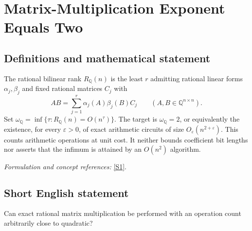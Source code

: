 \documentclass[11pt,a4paper]{article}
\newcommand{\Q}{\mathbb{Q}}
\newcommand{\sref}[2]{\hyperlink{source:#1:#2}{[S#2]}}
\newif\ifshowcatalogue
\newcommand{\cataloguescope}[1]{\ifshowcatalogue
 \paragraph{Exact scope in the supplied catalogue.}
 \begin{quote}\small #1\end{quote}\fi}
\numberwithin{equation}{section}
\begin{document}
\setcounter{section}{25}
\clearpage
\section{\texorpdfstring{Matrix-Multiplication Exponent Equals Two}{Matrix-Multiplication Exponent Equals Two}}\label{26}
\subsection{Definitions and mathematical statement}
The rational bilinear rank $R_{\Q}(n)$ is the least $r$ admitting rational linear forms $\alpha_j,\beta_j$ and fixed rational matrices $C_j$ with
\[
 AB=\sum_{j=1}^r\alpha_j(A)\beta_j(B)C_j\qquad(A,B\in\Q^{n\times n}).
\]
Set $\omega_{\Q}=\inf\{\tau:R_{\Q}(n)=O(n^\tau)\}$. The target is $\omega_{\Q}=2$, or equivalently the existence, for every $\varepsilon>0$, of exact arithmetic circuits of size $O_\varepsilon(n^{2+\varepsilon})$. This counts arithmetic operations at unit cost. It neither bounds coefficient bit lengths nor asserts that the infimum is attained by an $O(n^2)$ algorithm.
\par\smallskip\textit{Formulation and concept references:} \sref{26}{1}.
\cataloguescope{Let R\_Q(n) be the tensor rank over Q of the bilinear map multiplying two n by n rational matrices: the least r for which AB is a sum of r products alpha\_j(A) beta\_j(B) C\_j, with rational linear forms alpha\_j, beta\_j and rational output matrices C\_j. Set omega\_Q = inf\{tau in R : R\_Q(n) = O(n\textasciicircum{}tau)\}. Prove omega\_Q = 2. Equivalently, for every epsilon > 0, exact multiplication admits division-free arithmetic circuits over Q of size O(n\textasciicircum{}(2+epsilon)), counting rational additions, subtractions, multiplications and constant scalar operations at unit cost. Circuits need not be uniformly generated and rational coefficient bit lengths are not charged. Constants and thresholds may depend on epsilon. Literal O(n\textasciicircum{}2) attainment is not required.}
\subsection{Short English statement}
Can exact rational matrix multiplication be performed with an operation count arbitrarily close to quadratic?
\end{document}
